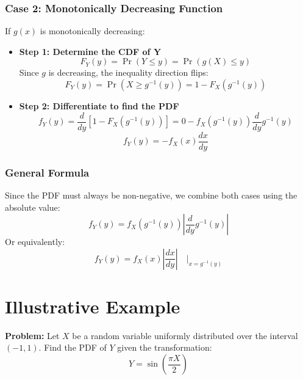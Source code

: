 \documentclass[12pt]{article}
\begin{document}
\subsubsection*{Case 2: Monotonically Decreasing Function}
If $g(x)$ is monotonically decreasing:
\begin{itemize}
    \item \textbf{Step 1: Determine the CDF of Y}
    $$ F_Y(y) = \Pr(Y \le y) = \Pr(g(X) \le y) $$
    Since $g$ is decreasing, the inequality direction flips:
    $$ F_Y(y) = \Pr(X \ge g^{-1}(y)) = 1 - F_X(g^{-1}(y)) $$
    
    \item \textbf{Step 2: Differentiate to find the PDF}
    $$ f_Y(y) = \frac{d}{dy} [1 - F_X(g^{-1}(y))] = 0 - f_X(g^{-1}(y)) \frac{d}{dy} g^{-1}(y) $$
    $$ f_Y(y) = - f_X(x) \frac{dx}{dy} $$
\end{itemize}

\subsubsection*{General Formula}
Since the PDF must always be non-negative, we combine both cases using the absolute value:
$$ f_Y(y) = f_X(g^{-1}(y)) \left| \frac{d}{dy} g^{-1}(y) \right| $$
Or equivalently:
$$ f_Y(y) = f_X(x) \left| \frac{dx}{dy} \right| \quad \bigg|_{x = g^{-1}(y)} $$

\section{Illustrative Example}
\textbf{Problem:} Let $X$ be a random variable uniformly distributed over the interval $(-1, 1)$. Find the PDF of $Y$ given the transformation:
$$ Y = \sin\left(\frac{\pi X}{2}\right) $$
\end{document}
